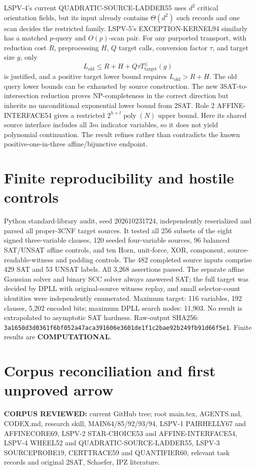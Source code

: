 \documentclass[11pt]{article}
\begin{document}
LSPV-4's current QUADRATIC-SOURCE-LADDER55 uses $d^2$ critical orientation fields, but its input already contains $\Theta(d^2)$ such records and one scan decides the restricted family. LSPV-5's EXCEPTION-KERNEL94 similarly has a matched $p$-query and $O(p)$-scan pair. For any purported transport, with reduction cost $R$, preprocessing $H$, $Q$ target calls, conversion factor $\tau$, and target size $g$, only
\[
L_{\mathrm{old}}\le R+H+Q\tau T_{\mathrm{target}}^{\le}(g)
\]
is justified, and a positive target lower bound requires $L_{\mathrm{old}}>R+H$.
The old query lower bounds can be exhausted by source construction. The new 3SAT-to-intersection reduction proves NP-completeness in the correct direction but inherits no unconditional exponential lower bound from 2SAT. Role 2 AFFINE-INTERFACE54 gives a restricted $2^{h+t}\operatorname{poly}(N)$ upper bound. Here its shared source interface includes all $3m$ indicator variables, so it does not yield polynomial continuation. The result refines rather than contradicts the known positive-one-in-three affine/bijunctive endpoint.

\section{Finite reproducibility and hostile controls}
Python standard-library audit, seed 202610231724, independently reserialized and parsed all proper-3CNF target sources. It tested all 256 subsets of the eight signed three-variable clauses, 120 seeded four-variable sources, 96 balanced SAT/UNSAT affine controls, and ten Horn, unit-force, XOR, component, source-readable-witness and padding controls. The 482 completed source inputs comprise 429 SAT and 53 UNSAT labels. All 3,268 assertions passed. The separate affine Gaussian solver and binary SCC solver always answered SAT; the full target was decided by DPLL with original-source witness replay, and small selector-count identities were independently enumerated. Maximum target: 116 variables, 192 clauses, 5,202 encoded bits; maximum DPLL search nodes: 11,903. No result is extrapolated to asymptotic SAT hardness. Raw-output SHA256:
\texttt{3a1650d3d0361f6bf052a47aca391606e3601de1f1c2bae92b249fb91d66f5e1}.
Finite results are \textbf{COMPUTATIONAL}.

\section{Corpus reconciliation and first unproved arrow}
\noindent\textbf{CORPUS REVIEWED:} current GitHub tree; root main.tex, AGENTS.md, CODEX.md, research skill, MAIN64/85/92/93/94, LSPV-1 PAIRHELLY67 and AFFINECORE69, LSPV-2 STAR-CHOICE53 and AFFINE-INTERFACE54, LSPV-4 WHEEL52 and QUADRATIC-SOURCE-LADDER55, LSPV-3 SOURCEPROBE19, CERTTRACE59 and QUANTIFIER60, relevant task records and original 2SAT, Schaefer, IPZ literature.
\end{document}
